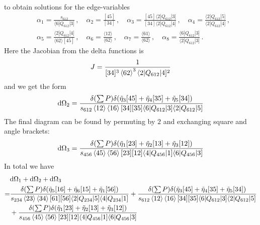 \documentclass[letter,11pt]{article}
\newcommand{\ab}[1]{\langle #1 \rangle}
\newcommand{\aMs}[3]{\langle #1|#2|#3]}  		%
\newcommand{\sab}[1]{s_{#1}}
\begin{document}
to obtain solutions for the edge-variables
\begin{equation}
	\begin{aligned}
			& \alpha_1 = \frac{\sab{612}}{\aMs{6}{Q_{612}}{3}}\,, \quad \alpha_2 = \frac{[45]}{[34]}\,, \quad \alpha_3 = \frac{[45]\aMs{2}{Q_{612}}{3}}{[34]\aMs{2}{Q_{612}}{4}}\,, \quad \alpha_4 = \frac{\aMs{2}{Q_{612}}{5}}{\aMs{2}{Q_{612}}{4}}\,,\\ 
		&\alpha_5 = \frac{\aMs{2}{Q_{612}}{4}}{\ab{62}[45]}\,, 
		 \quad
		\alpha_6 = \frac{\ab{12}}{\ab{62}}\,,\quad \alpha_7 = \frac{\ab{61}}{\ab{62}}\,,\quad
		\alpha_8 =  \frac{\aMs{6}{Q_{612}}{3}}{\aMs{2}{Q_{612}}{3}}\,.
	\end{aligned}
\end{equation}
Here the Jacobian from the delta functions is
\begin{equation}
	\begin{aligned}
		J=\frac{1}{[34]^3\expval{62}^3\aMs{2}{Q_{612}}{4}^2}
	\end{aligned}
\end{equation}
and we get the form
\begin{equation}
	\begin{aligned}
		\dd \Omega_2=\frac{\delta(\sum P)\delta(\tilde\eta_3[45]+\tilde\eta_4[35]+\tilde\eta_5[34])}{s_{612}\expval{12}\expval{16}[34][35]\aMs{6}{Q_{612}}{3}\aMs{2}{Q_{612}}{5}}
	\end{aligned}
\end{equation}
The final diagram can be found by permuting by $2$ and exchanging square and angle brackets:
\begin{equation}
	\begin{aligned}
		\dd \Omega_3=\frac{\delta(\sum P)\delta(\tilde\eta_1[23]+\tilde\eta_2[13]+\tilde\eta_3[12])}{s_{456}\expval{45}\expval{56}[23][12]\aMs{4}{Q_{456}}{1}\aMs{6}{Q_{456}}{3}}
	\end{aligned}
\end{equation}
In total we have
\begin{equation}
	\begin{aligned}
		&\dd \Omega_1 +\dd \Omega_2+\dd \Omega_3\\
		=&\frac{\delta(\sum P)\delta(\tilde\eta_5[16]+\tilde\eta_6[15]+\tilde\eta_1[56])}{s_{234}\expval{23}\expval{34}[61][56]\aMs{2}{Q_{234}}{5}\aMs{4}{Q_{234}}{1}}
		+\frac{\delta(\sum P)\delta(\tilde\eta_3[45]+\tilde\eta_4[35]+\tilde\eta_5[34])}{s_{612}\expval{12}\expval{16}[34][35]\aMs{6}{Q_{612}}{3}\aMs{2}{Q_{612}}{5}}
		\\&+\frac{\delta(\sum P)\delta(\tilde\eta_1[23]+\tilde\eta_2[13]+\tilde\eta_3[12])}{s_{456}\expval{45}\expval{56}[23][12]\aMs{4}{Q_{456}}{1}\aMs{6}{Q_{456}}{3}}
	\end{aligned}
\end{equation}
\end{document}
